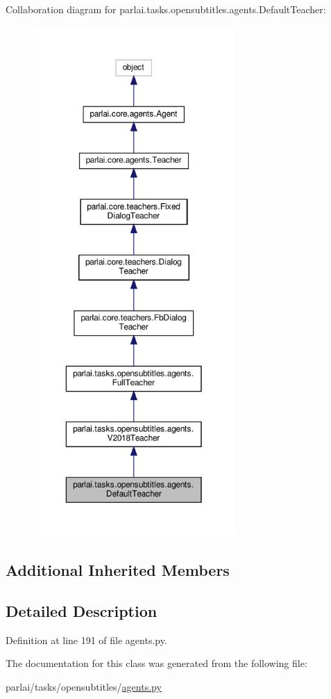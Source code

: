 Collaboration diagram for parlai.\+tasks.\+opensubtitles.\+agents.\+Default\+Teacher\+:
\nopagebreak
\begin{figure}[H]
\begin{center}
\leavevmode
\includegraphics[height=550pt]{db/de3/classparlai_1_1tasks_1_1opensubtitles_1_1agents_1_1DefaultTeacher__coll__graph}
\end{center}
\end{figure}
\subsection*{Additional Inherited Members}


\subsection{Detailed Description}


Definition at line 191 of file agents.\+py.



The documentation for this class was generated from the following file\+:\begin{DoxyCompactItemize}
\item 
parlai/tasks/opensubtitles/\hyperlink{parlai_2tasks_2opensubtitles_2agents_8py}{agents.\+py}\end{DoxyCompactItemize}
